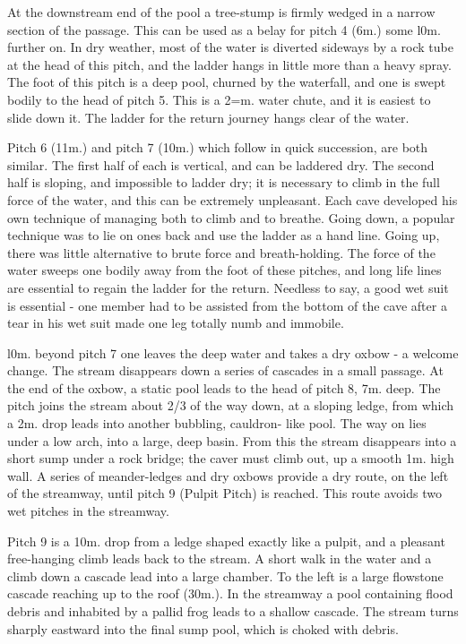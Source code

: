 \documentclass[11pt, a4paper, twoside]{memoir}
\begin{document}
At the downstream end of the pool a tree-stump is firmly wedged in a narrow section of the passage. This can be used as a belay for pitch 4 (6m.) some l0m. further on. In dry weather, most of the water is diverted sideways by a rock tube at the head of this pitch, and the ladder hangs in little more than a heavy spray. The foot of this pitch is a deep pool, churned by the waterfall, and one is swept bodily to the head of pitch 5. This is a 2=m. water chute, and it is easiest to slide down it. The ladder for the return journey hangs clear of the water.

Pitch 6 (11m.) and pitch 7 (10m.) which follow in quick succession, are both similar. The first half of each is vertical, and can be laddered dry. The second half is sloping, and impossible to ladder dry; it is necessary to climb in the full force of the water, and this can be extremely unpleasant. Each cave developed his own technique of managing both to climb and to breathe. Going down, a popular technique was to lie on ones back and use the ladder as a hand line. Going up, there was little alternative to brute force and breath-holding. The force of the water sweeps one bodily away from the foot of these pitches, and long life lines are essential to regain the ladder for the return. Needless to say, a good wet suit is essential - one member had to be assisted from the bottom of the cave after a tear in his wet suit made one leg totally numb and immobile.

l0m. beyond pitch 7 one leaves the deep water and takes a dry oxbow - a welcome change. The stream disappears down a series of cascades in a small passage. At the end of the oxbow, a static pool leads to the head of pitch 8, 7m. deep. The pitch joins the stream about 2/3 of the way down, at a sloping ledge, from which a 2m. drop leads into another bubbling, cauldron- like pool. The way on lies under a low arch, into a large, deep basin. From this the stream disappears into a short sump under a rock bridge; the caver must climb out, up a smooth 1m. high wall. A series of meander-ledges and dry oxbows provide a dry route, on the left of the streamway, until pitch 9 (Pulpit Pitch) is reached. This route avoids two wet pitches in the streamway.

Pitch 9 is a 10m. drop from a ledge shaped exactly like a pulpit, and a pleasant free-hanging climb leads back to the stream. A short walk in the water and a climb down a cascade lead into a large chamber. To the left is a large flowstone cascade reaching up to the roof (30m.). In the streamway a pool containing flood debris and inhabited by a pallid frog leads to a shallow cascade. The stream turns sharply eastward into the final sump pool, which is choked with debris.
\end{document}

